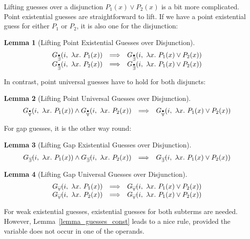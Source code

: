 \documentclass[a4paper,12pt,DIV=12,oneside]{scrbook}
\newtheorem{lemma}{Lemma}[section]
\theoremstyle{definition}
\theoremstyle{remark}
\newcommand{\GEP}{\ensuremath{G_{\accentset{\bullet}{\exists}}}}
\newcommand{\GEG}{\ensuremath{G_{\accentset{\_\,\_}{\exists}}}}
\newcommand{\GUP}{\ensuremath{G_{\accentset{\bullet}{\forall}}}}
\newcommand{\GUG}{\ensuremath{G_{\accentset{\_\,\_}{\forall}}}}
\begin{document}
Lifting guesses over a disjunction $P_1(x) \vee P_2(x)$ is a bit more
complicated. Point existential guesses are straightforward to lift. If we
have a point existential guess for either $P_1$ or $P_2$, it is also one for
the disjunction:
%
\begin{lemma}[Lifting Point Existential Guesses over Disjunction]\label{lemma_guesses_lift_disj_T}
\[
\begin{array}{l@{\quad}l@{\quad}l}
\GEP(i,\ \lambda x.\ P_1(x)) & \Longrightarrow & \GEP(i,\ \lambda x.\ P_1(x) \vee P_2(x)) \\
\GEP(i,\ \lambda x.\ P_2(x)) & \Longrightarrow & \GEP(i,\ \lambda x.\ P_1(x) \vee P_2(x)) 
\end{array}
\]
\end{lemma}
%
In contrast, point universal guesses have to hold for both disjuncts:
\begin{lemma}[Lifting Point Universal Guesses over Disjunction]\label{lemma_guesses_lift_disj_F}
\[
\begin{array}{l@{\quad}l@{\quad}l}
\GUP(i,\ \lambda x.\ P_1(x)) \wedge \GUP(i,\ \lambda x.\ P_2(x)) & \Longrightarrow & \GUP(i,\ \lambda x.\ P_1(x) \vee P_2(x))
\end{array}
\]
\end{lemma}
%
For gap guesses, it is the other way round:
%
\begin{lemma}[Lifting Gap Existential Guesses over Disjunction]\label{lemma_guesses_lift_disj_SE}
\[
\begin{array}{l@{\quad}l@{\quad}l}
\GEG(i,\ \lambda x.\ P_1(x)) \wedge \GEG(i,\ \lambda x.\ P_2(x)) & \Longrightarrow & \GEG(i,\ \lambda x.\ P_1(x) \vee P_2(x))
\end{array}
\]
\end{lemma}
%
\begin{lemma}[Lifting Gap Universal Guesses over Disjunction]\label{lemma_guesses_lift_disj_SA}
\[
\begin{array}{l@{\quad}l@{\quad}l}
\GUG(i,\ \lambda x.\ P_1(x)) & \Longrightarrow & \GUG(i,\ \lambda x.\ P_1(x) \vee P_2(x)) \\
\GUG(i,\ \lambda x.\ P_2(x)) & \Longrightarrow & \GUG(i,\ \lambda x.\ P_1(x) \vee P_2(x)) 
\end{array}
\]
\end{lemma}

For weak existential guesses, existential guesses for both subterms are needed. However,
Lemma~\ref{lemma_guesses_const} leads to a nice rule, provided the
variable does not occur in one of the operands.
\end{document}
